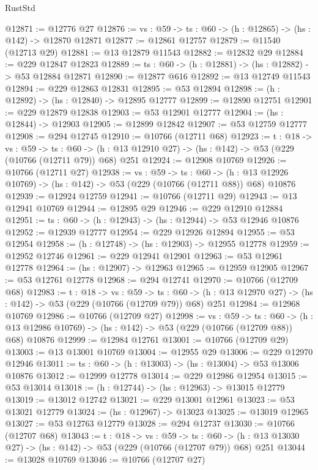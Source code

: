 \begin{lexlean}{RustStd}
\begin{coremodule}
@12871 := @12776 @27
@12876 := {vs : @59} -> {ts : @60} -> (h : @12865) -> (hs : @142) -> @12870 @12871
@12877 := @12861 @12757
@12879 := @11540 (@12713 @29)
@12881 := @13 @12879 @11543
@12882 := @12832 @29
@12884 := @229 @12847 @12823
@12889 := {ts : @60} -> (h : @12881) -> (hs : @12882) -> @53 @12884 @12871
@12890 := @12877 @616
@12892 := @13 @12749 @11543
@12894 := @229 @12863 @12831
@12895 := @53 @12894
@12898 := (h : @12892) -> (hs : @12840) -> @12895 @12777
@12899 := @12890 @12751
@12901 := @229 @12879 @12838
@12903 := @53 @12901 @12777
@12904 := (hs : @12844) -> @12903
@12905 := @12899 @12842
@12907 := @53 @12759 @12777
@12908 := @294 @12745
@12910 := @10766 (@12711 @68)
@12923 := {t : @18} ->
  {vs : @59} ->
  {ts : @60} -> (h : @13 @12910 @27) -> (hs : @142) -> @53 (@229 (@10766 (@12711 @79)) @68) @251
@12924 := @12908 @10769
@12926 := @10766 (@12711 @27)
@12938 := {vs : @59} ->
  {ts : @60} ->
  (h : @13 @12926 @10769) -> (hs : @142) -> @53 (@229 (@10766 (@12711 @88)) @68) @10876
@12939 := @12924 @12759
@12941 := @10766 (@12711 @29)
@12943 := @13 @12941 @10769
@12944 := @12895 @29
@12946 := @229 @12910 @12884
@12951 := {ts : @60} -> (h : @12943) -> (hs : @12944) -> @53 @12946 @10876
@12952 := @12939 @12777
@12954 := @229 @12926 @12894
@12955 := @53 @12954
@12958 := (h : @12748) -> (hs : @12903) -> @12955 @12778
@12959 := @12952 @12746
@12961 := @229 @12941 @12901
@12963 := @53 @12961 @12778
@12964 := (hs : @12907) -> @12963
@12965 := @12959 @12905
@12967 := @53 @12761 @12778
@12968 := @294 @12741
@12970 := @10766 (@12709 @68)
@12983 := {t : @18} ->
  {vs : @59} ->
  {ts : @60} -> (h : @13 @12970 @27) -> (hs : @142) -> @53 (@229 (@10766 (@12709 @79)) @68) @251
@12984 := @12968 @10769
@12986 := @10766 (@12709 @27)
@12998 := {vs : @59} ->
  {ts : @60} ->
  (h : @13 @12986 @10769) -> (hs : @142) -> @53 (@229 (@10766 (@12709 @88)) @68) @10876
@12999 := @12984 @12761
@13001 := @10766 (@12709 @29)
@13003 := @13 @13001 @10769
@13004 := @12955 @29
@13006 := @229 @12970 @12946
@13011 := {ts : @60} -> (h : @13003) -> (hs : @13004) -> @53 @13006 @10876
@13012 := @12999 @12778
@13014 := @229 @12986 @12954
@13015 := @53 @13014
@13018 := (h : @12744) -> (hs : @12963) -> @13015 @12779
@13019 := @13012 @12742
@13021 := @229 @13001 @12961
@13023 := @53 @13021 @12779
@13024 := (hs : @12967) -> @13023
@13025 := @13019 @12965
@13027 := @53 @12763 @12779
@13028 := @294 @12737
@13030 := @10766 (@12707 @68)
@13043 := {t : @18} ->
  {vs : @59} ->
  {ts : @60} -> (h : @13 @13030 @27) -> (hs : @142) -> @53 (@229 (@10766 (@12707 @79)) @68) @251
@13044 := @13028 @10769
@13046 := @10766 (@12707 @27)

\end{coremodule}
\end{lexlean}

